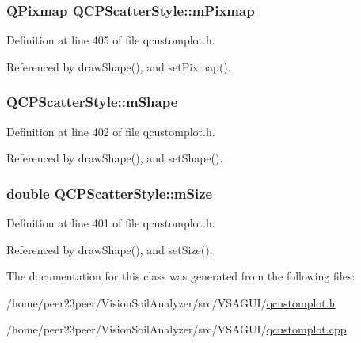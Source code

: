 \subsubsection[{m\+Pixmap}]{\setlength{\rightskip}{0pt plus 5cm}Q\+Pixmap Q\+C\+P\+Scatter\+Style\+::m\+Pixmap\hspace{0.3cm}{\ttfamily [protected]}}\label{class_q_c_p_scatter_style_a7697346c89b19d4cd1d8dd33319ec9e3}


Definition at line 405 of file qcustomplot.\+h.



Referenced by draw\+Shape(), and set\+Pixmap().

\hypertarget{class_q_c_p_scatter_style_af1b327f35f107ed108290187bbc8c7c6}{}
\subsubsection[{m\+Shape}]{ Q\+C\+P\+Scatter\+Style\+::m\+Shape\hspace{0.3cm}{\ttfamily [protected]}}\label{class_q_c_p_scatter_style_af1b327f35f107ed108290187bbc8c7c6}


Definition at line 402 of file qcustomplot.\+h.



Referenced by draw\+Shape(), and set\+Shape().

\hypertarget{class_q_c_p_scatter_style_a757da98671eb06b221979373ac2cec91}{}
\subsubsection[{m\+Size}]{\setlength{\rightskip}{0pt plus 5cm}double Q\+C\+P\+Scatter\+Style\+::m\+Size\hspace{0.3cm}{\ttfamily [protected]}}\label{class_q_c_p_scatter_style_a757da98671eb06b221979373ac2cec91}


Definition at line 401 of file qcustomplot.\+h.



Referenced by draw\+Shape(), and set\+Size().



The documentation for this class was generated from the following files\+:\begin{DoxyCompactItemize}
\item 
/home/peer23peer/\+Vision\+Soil\+Analyzer/src/\+V\+S\+A\+G\+U\+I/\hyperlink{qcustomplot_8h}{qcustomplot.\+h}\item 
/home/peer23peer/\+Vision\+Soil\+Analyzer/src/\+V\+S\+A\+G\+U\+I/\hyperlink{qcustomplot_8cpp}{qcustomplot.\+cpp}\end{DoxyCompactItemize}
